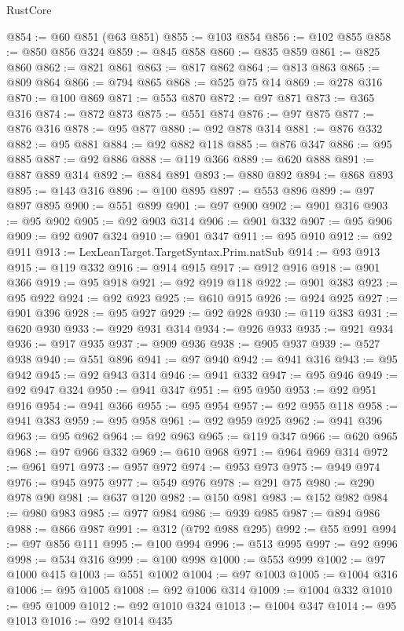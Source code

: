 \begin{lexlean}{RustCore}
\begin{coremodule}
@854 := @60 @851 (@63 @851)
@855 := @103 @854
@856 := @102 @855
@858 := @850 @856 @324
@859 := @845 @858
@860 := @835 @859
@861 := @825 @860
@862 := @821 @861
@863 := @817 @862
@864 := @813 @863
@865 := @809 @864
@866 := @794 @865
@868 := @525 @75 @14
@869 := @278 @316
@870 := @100 @869
@871 := @553 @870
@872 := @97 @871
@873 := @365 @316
@874 := @872 @873
@875 := @551 @874
@876 := @97 @875
@877 := @876 @316
@878 := @95 @877
@880 := @92 @878 @314
@881 := @876 @332
@882 := @95 @881
@884 := @92 @882 @118
@885 := @876 @347
@886 := @95 @885
@887 := @92 @886
@888 := @119 @366
@889 := @620 @888
@891 := @887 @889 @314
@892 := @884 @891
@893 := @880 @892
@894 := @868 @893
@895 := @143 @316
@896 := @100 @895
@897 := @553 @896
@899 := @97 @897 @895
@900 := @551 @899
@901 := @97 @900
@902 := @901 @316
@903 := @95 @902
@905 := @92 @903 @314
@906 := @901 @332
@907 := @95 @906
@909 := @92 @907 @324
@910 := @901 @347
@911 := @95 @910
@912 := @92 @911
@913 := LexLeanTarget.TargetSyntax.Prim.natSub
@914 := @93 @913
@915 := @119 @332
@916 := @914 @915
@917 := @912 @916
@918 := @901 @366
@919 := @95 @918
@921 := @92 @919 @118
@922 := @901 @383
@923 := @95 @922
@924 := @92 @923
@925 := @610 @915
@926 := @924 @925
@927 := @901 @396
@928 := @95 @927
@929 := @92 @928
@930 := @119 @383
@931 := @620 @930
@933 := @929 @931 @314
@934 := @926 @933
@935 := @921 @934
@936 := @917 @935
@937 := @909 @936
@938 := @905 @937
@939 := @527 @938
@940 := @551 @896
@941 := @97 @940
@942 := @941 @316
@943 := @95 @942
@945 := @92 @943 @314
@946 := @941 @332
@947 := @95 @946
@949 := @92 @947 @324
@950 := @941 @347
@951 := @95 @950
@953 := @92 @951 @916
@954 := @941 @366
@955 := @95 @954
@957 := @92 @955 @118
@958 := @941 @383
@959 := @95 @958
@961 := @92 @959 @925
@962 := @941 @396
@963 := @95 @962
@964 := @92 @963
@965 := @119 @347
@966 := @620 @965
@968 := @97 @966 @332
@969 := @610 @968
@971 := @964 @969 @314
@972 := @961 @971
@973 := @957 @972
@974 := @953 @973
@975 := @949 @974
@976 := @945 @975
@977 := @549 @976
@978 := @291 @75
@980 := @290 @978 @90
@981 := @637 @120
@982 := @150 @981
@983 := @152 @982
@984 := @980 @983
@985 := @977 @984
@986 := @939 @985
@987 := @894 @986
@988 := @866 @987
@991 := @312 (@792 @988 @295)
@992 := @55 @991
@994 := @97 @856 @111
@995 := @100 @994
@996 := @513 @995
@997 := @92 @996
@998 := @534 @316
@999 := @100 @998
@1000 := @553 @999
@1002 := @97 @1000 @415
@1003 := @551 @1002
@1004 := @97 @1003
@1005 := @1004 @316
@1006 := @95 @1005
@1008 := @92 @1006 @314
@1009 := @1004 @332
@1010 := @95 @1009
@1012 := @92 @1010 @324
@1013 := @1004 @347
@1014 := @95 @1013
@1016 := @92 @1014 @435

\end{coremodule}
\end{lexlean}
